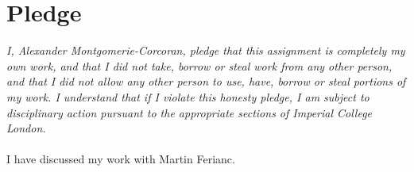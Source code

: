 \documentclass[10pt,twocolumn,letterpaper]{article}
\begin{document}
\section{Pledge}
\textit{I, Alexander Montgomerie-Corcoran, pledge that this assignment is completely my own work, and that I did not take,
borrow or steal work from any other person, and that I did not allow any other person to use, have, borrow
or steal portions of my work. I understand that if I violate this honesty pledge, I am subject to disciplinary
action pursuant to the appropriate sections of Imperial College London.}
\\
\\
I have discussed my work with Martin Ferianc.
\end{document}
